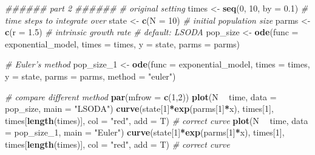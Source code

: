 \documentclass[
]{book}
\newenvironment{Shaded}{\begin{snugshade}}{\end{snugshade}}
\newcommand{\CommentTok}[1]{\textcolor[rgb]{0.56,0.35,0.01}{\textit{#1}}}
\newcommand{\DataTypeTok}[1]{\textcolor[rgb]{0.13,0.29,0.53}{#1}}
\newcommand{\DecValTok}[1]{\textcolor[rgb]{0.00,0.00,0.81}{#1}}
\newcommand{\FloatTok}[1]{\textcolor[rgb]{0.00,0.00,0.81}{#1}}
\newcommand{\KeywordTok}[1]{\textcolor[rgb]{0.13,0.29,0.53}{\textbf{#1}}}
\newcommand{\NormalTok}[1]{#1}
\newcommand{\OperatorTok}[1]{\textcolor[rgb]{0.81,0.36,0.00}{\textbf{#1}}}
\newcommand{\StringTok}[1]{\textcolor[rgb]{0.31,0.60,0.02}{#1}}
\begin{document}
\begin{Shaded}
\begin{Highlighting}[]
\CommentTok{###### part 2 ######}
\CommentTok{# original setting}
\NormalTok{times <-}\StringTok{ }\KeywordTok{seq}\NormalTok{(}\DecValTok{0}\NormalTok{, }\DecValTok{10}\NormalTok{, }\DataTypeTok{by =} \FloatTok{0.1}\NormalTok{)  }\CommentTok{# time steps to integrate over}
\NormalTok{state <-}\StringTok{ }\KeywordTok{c}\NormalTok{(}\DataTypeTok{N =} \DecValTok{10}\NormalTok{)  }\CommentTok{# initial population size}
\NormalTok{parms <-}\StringTok{ }\KeywordTok{c}\NormalTok{(}\DataTypeTok{r =} \FloatTok{1.5}\NormalTok{)  }\CommentTok{# intrinsic growth rate}
\CommentTok{# default: LSODA}
\NormalTok{pop_size <-}\StringTok{ }\KeywordTok{ode}\NormalTok{(}\DataTypeTok{func =}\NormalTok{ exponential_model, }\DataTypeTok{times =}\NormalTok{ times, }\DataTypeTok{y =}\NormalTok{ state, }\DataTypeTok{parms =}\NormalTok{ parms)}

\CommentTok{# Euler's method}
\NormalTok{pop_size_}\DecValTok{1}\NormalTok{ <-}\StringTok{ }\KeywordTok{ode}\NormalTok{(}\DataTypeTok{func =}\NormalTok{ exponential_model, }\DataTypeTok{times =}\NormalTok{ times, }\DataTypeTok{y =}\NormalTok{ state, }\DataTypeTok{parms =}\NormalTok{ parms, }\DataTypeTok{method =} \StringTok{"euler"}\NormalTok{)}

\CommentTok{# compare different method}
\KeywordTok{par}\NormalTok{(}\DataTypeTok{mfrow =} \KeywordTok{c}\NormalTok{(}\DecValTok{1}\NormalTok{,}\DecValTok{2}\NormalTok{))}
\KeywordTok{plot}\NormalTok{(N }\OperatorTok{~}\StringTok{ }\NormalTok{time, }\DataTypeTok{data =}\NormalTok{ pop_size, }\DataTypeTok{main =} \StringTok{"LSODA"}\NormalTok{)}
\KeywordTok{curve}\NormalTok{(state[}\DecValTok{1}\NormalTok{]}\OperatorTok{*}\KeywordTok{exp}\NormalTok{(parms[}\DecValTok{1}\NormalTok{]}\OperatorTok{*}\NormalTok{x), times[}\DecValTok{1}\NormalTok{], times[}\KeywordTok{length}\NormalTok{(times)], }\DataTypeTok{col =} \StringTok{"red"}\NormalTok{, }\DataTypeTok{add =}\NormalTok{ T) }\CommentTok{# correct curve}
\KeywordTok{plot}\NormalTok{(N }\OperatorTok{~}\StringTok{ }\NormalTok{time, }\DataTypeTok{data =}\NormalTok{ pop_size_}\DecValTok{1}\NormalTok{, }\DataTypeTok{main =} \StringTok{"Euler"}\NormalTok{)}
\KeywordTok{curve}\NormalTok{(state[}\DecValTok{1}\NormalTok{]}\OperatorTok{*}\KeywordTok{exp}\NormalTok{(parms[}\DecValTok{1}\NormalTok{]}\OperatorTok{*}\NormalTok{x), times[}\DecValTok{1}\NormalTok{], times[}\KeywordTok{length}\NormalTok{(times)], }\DataTypeTok{col =} \StringTok{"red"}\NormalTok{, }\DataTypeTok{add =}\NormalTok{ T) }\CommentTok{# correct curve}
\end{Highlighting}
\end{Shaded}
\end{document}
